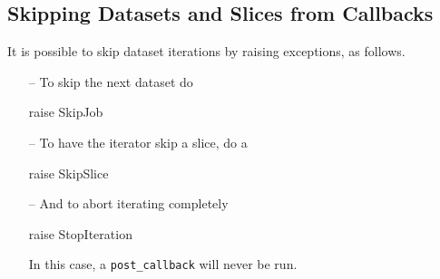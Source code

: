 \subsection{Skipping Datasets and Slices from Callbacks}
It is possible to skip dataset iterations by raising exceptions, as
follows.
\begin{itemize}
\item [--] To skip the next dataset do
\begin{python}
raise SkipJob
\end{python}

\item [--]  To have the iterator skip a slice, do a
\begin{python}
raise SkipSlice
\end{python}

\item [--] And to abort iterating completely
\begin{python}
raise StopIteration
\end{python}
In this case, a \texttt{post\_callback} will never be run.
\end{itemize}








